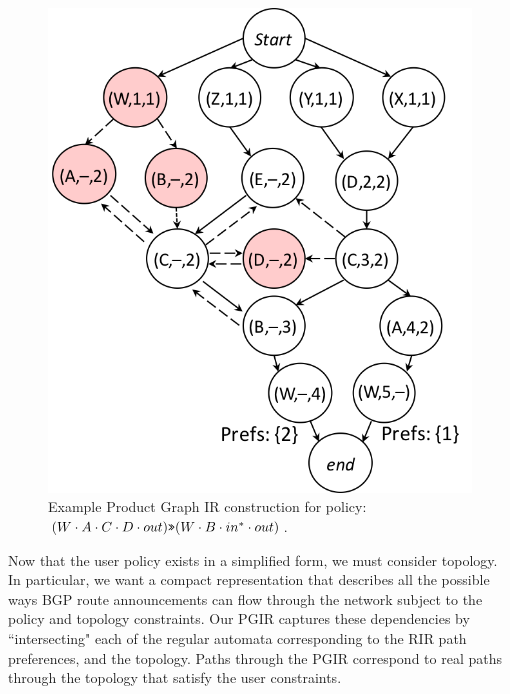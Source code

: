 \begin{figure}
\begin{minipage}[t]{.5\linewidth}
  \end{minipage}
  ~~
  ~~
  \begin{minipage}[t]{.5\linewidth}
  \vspace*{-1\baselineskip}
  \includegraphics[width=.65\columnwidth]{figures/productgraph}
  \end{minipage}

  \hrulefill
  \vspace*{.4em}

  \caption{Example Product Graph IR construction for policy: $(W \cdot A \cdot C \cdot D \cdot out) \texttt{>>} (W \cdot B \cdot in^* \cdot out)$.}
  \label{fig:example-compilation}
\end{figure}

Now that the user policy exists in a simplified form, we must consider topology. In particular, we want a compact representation that describes all the possible ways BGP route announcements can flow through the network subject to the policy and topology constraints. Our PGIR captures these dependencies by ``intersecting" each of the regular automata corresponding to the RIR path preferences, and the topology. Paths through the PGIR correspond to real paths through the topology that satisfy the user constraints.

